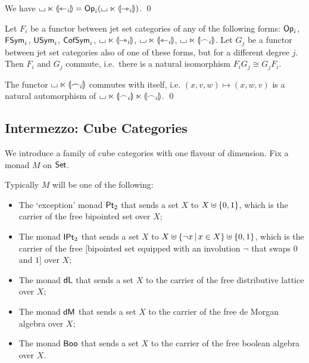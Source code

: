 \documentclass[a4paper]{article}
\begin{document}
\begin{corollary} \label{thm:twisted-prism-op}
	We have ${\llcorner\hspace{-.4ex}\lrcorner} \ltimes {\llparenthesis \leftarrowtriangle_i \rrparenthesis} = {\mathsf{Op}}_i({\llcorner\hspace{-.4ex}\lrcorner} \ltimes {\llparenthesis \rightarrowtriangle_i \rrparenthesis})$. \qed
\end{corollary}
\begin{corollary} \label{thm:commute-diff-degree}
	Let $F_i$ be a functor between jet set categories of any of the following forms: ${\mathsf{Op}}_i$, $\mathsf{FSym}_i$, $\mathsf{USym}_i$, $\mathsf{CofSym}_i$, ${\llcorner\hspace{-.4ex}\lrcorner} \ltimes {\llparenthesis \rightarrowtriangle_i \rrparenthesis}$, ${\llcorner\hspace{-.4ex}\lrcorner} \ltimes {\llparenthesis \leftarrowtriangle_i \rrparenthesis}$, ${\llcorner\hspace{-.4ex}\lrcorner} \ltimes {\llparenthesis \frown_i \rrparenthesis}$.
	Let $G_j$ be a functor between jet set categories also of one of these forms, but for a different degree $j$.
	Then $F_i$ and $G_j$ commute, i.e.\ there is a natural isomorphism $F_i G_j \cong G_j F_i$.
\end{corollary}
\begin{corollary} \label{thm:commute-symmetric}
The functor ${\llcorner\hspace{-.4ex}\lrcorner} \ltimes {\llparenthesis \frown_i \rrparenthesis}$ commutes with itself, i.e. $(x, v, w) \mapsto (x, w, v)$ is a natural automorphism of ${\llcorner\hspace{-.4ex}\lrcorner} \ltimes {\llparenthesis \frown_i \rrparenthesis} \ltimes {\llparenthesis \frown_i \rrparenthesis}$. \qed
\end{corollary}

\subsection{Intermezzo: Cube Categories} \label{sec:cubes}
We introduce a family of cube categories with one flavour of dimension. Fix a monad $M$ on ${\mathsf{Set}}$.
\begin{example} \label{ex:cube-monads}
	Typically $M$ will be one of the following:
	\begin{itemize}
		\item The `exception' monad ${\mathsf{Pt}_2}$ that sends a set $X$ to $X \uplus \mathopen{}\left\{ 0,1 \right\}\mathclose{}$, which is the carrier of the free bipointed set over $X$;
		\item The monad ${\mathsf{IPt}_2}$ that sends a set $X$ to $X \uplus \mathopen{}\left\{ \lnot x \,\middle|\, x \in X \right\}\mathclose{} \uplus \mathopen{}\left\{ 0, 1 \right\}\mathclose{}$, which is the carrier of the free [bipointed set equipped with an involution $\lnot$ that swaps $0$ and $1$] over $X$;
		\item The monad $\mathsf{dL}$ that sends a set $X$ to the carrier of the free distributive lattice over $X$;
		\item The monad $\mathsf{dM}$ that sends a set $X$ to the carrier of the free de Morgan algebra over $X$;
		\item The monad $\mathsf{Boo}$ that sends a set $X$ to the carrier of the free boolean algebra over $X$.
	\end{itemize}
\end{example}
\end{document}
